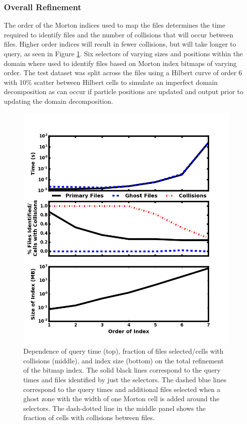 \documentclass[apjl]{emulateapj}
\begin{document}
\subsubsection{Overall Refinement}\label{SSS:test_order1}
The order of the Morton indices used to map the files determines the time required to identify files and the number of collisions that will occur between files. Higher order indices will result in fewer collisions, but will take longer to query, as seen in Figure \ref{fig:test_order1}. Six selectors of varying sizes and positions within the domain where used to identify files based on Morton index bitmaps of varying order. The test dataset was split across the files using a Hilbert curve of order 6 with 10\% scatter between Hilbert cells to simulate an imperfect domain decomposition as can occur if particle positions are updated and output prior to updating the domain decomposition.
%
\begin{figure}[htbp]
\begin{center}
\includegraphics[width=\columnwidth,keepaspectratio]{../images/vary_order1_or0.png}
\caption{Dependence of query time (top), fraction of files selected/cells with collisions (middle), and index size (bottom) on the total refinement of the bitmap index. The solid black lines correspond to the query times and files identified by just the selectors. The dashed blue lines correspond to the query times and additional files selected when a ghost zone with the width of one Morton cell is added around the selectors. The dash-dotted line in the middle panel shows the fraction of cells with collisions between files.}
\label{fig:test_order1}
\end{center}
\end{figure}
%
\end{document}

